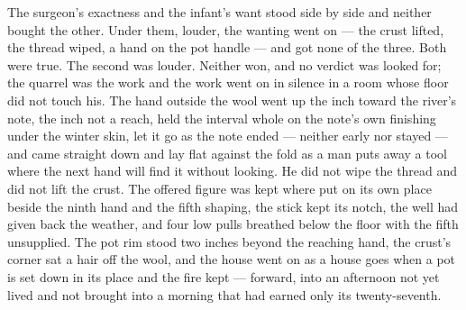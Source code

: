 The surgeon's exactness and the infant's want stood side by side and neither bought the other. Under them, louder, the wanting went on --- the crust lifted, the thread wiped, a hand on the pot handle --- and got none of the three. Both were true. The second was louder. Neither won, and no verdict was looked for; the quarrel was the work and the work went on in silence in a room whose floor did not touch his. The hand outside the wool went up the inch toward the river's note, the inch not a reach, held the interval whole on the note's own finishing under the winter skin, let it go as the note ended --- neither early nor stayed --- and came straight down and lay flat against the fold as a man puts away a tool where the next hand will find it without looking. He did not wipe the thread and did not lift the crust. The offered figure was kept where put on its own place beside the ninth hand and the fifth shaping, the stick kept its notch, the well had given back the weather, and four low pulls breathed below the floor with the fifth unsupplied. The pot rim stood two inches beyond the reaching hand, the crust's corner sat a hair off the wool, and the house went on as a house goes when a pot is set down in its place and the fire kept --- forward, into an afternoon not yet lived and not brought into a morning that had earned only its twenty-seventh.
